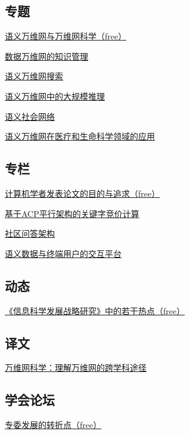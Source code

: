 \documentclass[a4paper]{article}
\begin{document}
\subsection{专题}
\href{http://history.ccf.org.cn/resources/1190201776262/2010/08/11/201008-1.pdf}{语义万维网与万维网科学（free）}

\href{http://history.ccf.org.cn/resources/1190201776262/2010/08/12/201008-2.pdf}{数据万维网的知识管理}

\href{http://history.ccf.org.cn/resources/1190201776262/2010/08/12/201008-3.pdf}{语义万维网搜索}

\href{http://history.ccf.org.cn/resources/1190201776262/2010/08/12/201008-4.pdf}{语义万维网中的大规模推理}

\href{http://history.ccf.org.cn/resources/1190201776262/2010/08/12/201008-5.pdf}{语义社会网络}

\href{http://history.ccf.org.cn/resources/1190201776262/2010/08/12/201008-6.pdf}{语义万维网在医疗和生命科学领域的应用}

\subsection{专栏}
\href{http://history.ccf.org.cn/resources/1190201776262/2010/08/12/201008-7.pdf}{计算机学者发表论文的目的与追求（free）}

\href{http://history.ccf.org.cn/resources/1190201776262/2010/08/12/201008-8.pdf}{基于ACP平行架构的关键字竞价计算}

\href{http://history.ccf.org.cn/resources/1190201776262/2010/08/12/201008-9.pdf}{社区问答架构}

\href{http://history.ccf.org.cn/resources/1190201776262/2010/08/12/201008-10.pdf}{语义数据与终端用户的交互平台}

\subsection{动态}
\href{http://history.ccf.org.cn/resources/1190201776262/2010/08/12/201008-11.pdf}{《信息科学发展战略研究》中的若干热点（free）}

\subsection{译文}
\href{http://history.ccf.org.cn/resources/1190201776262/2010/08/12/201008-12.pdf}{万维网科学：理解万维网的跨学科途径}

\subsection{学会论坛}
\href{http://history.ccf.org.cn/resources/1190201776262/2010/08/12/201008-14.pdf}{专委发展的转折点（free）}
\end{document}
